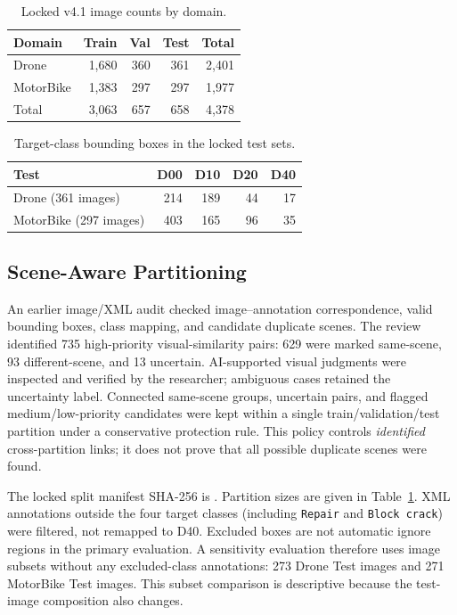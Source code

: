 \documentclass[conference,a4paper]{IEEEtran}
\begin{document}
\begin{table}[t]
\centering\caption{Locked v4.1 image counts by domain.}\label{tab:counts}
\begin{tabular}{lrrrr}\toprule
Domain & Train & Val & Test & Total\\\midrule
Drone & 1,680 & 360 & 361 & 2,401\\
MotorBike & 1,383 & 297 & 297 & 1,977\\\midrule
Total & 3,063 & 657 & 658 & 4,378\\\bottomrule
\end{tabular}
\end{table}

\begin{table}[t]
\centering\caption{Target-class bounding boxes in the locked test sets.}\label{tab:boxes}
\begin{tabular}{lrrrr}\toprule
Test & D00 & D10 & D20 & D40\\\midrule
Drone (361 images) & 214 & 189 & 44 & 17\\
MotorBike (297 images) & 403 & 165 & 96 & 35\\\bottomrule
\end{tabular}
\end{table}

\subsection{Scene-Aware Partitioning}
An earlier image/XML audit checked image–annotation correspondence, valid bounding boxes, class mapping, and candidate duplicate scenes. The review identified 735 high-priority visual-similarity pairs: 629 were marked same-scene, 93 different-scene, and 13 uncertain. AI-supported visual judgments were inspected and verified by the researcher; ambiguous cases retained the uncertainty label. Connected same-scene groups, uncertain pairs, and flagged medium/low-priority candidates were kept within a single train/validation/test partition under a conservative protection rule. This policy controls \emph{identified} cross-partition links; it does not prove that all possible duplicate scenes were found.

The locked split manifest SHA-256 is \texttt{}. Partition sizes are given in Table~\ref{tab:counts}. XML annotations outside the four target classes (including \texttt{Repair} and \texttt{Block crack}) were filtered, not remapped to D40. Excluded boxes are not automatic ignore regions in the primary evaluation. A sensitivity evaluation therefore uses image subsets without any excluded-class annotations: 273 Drone Test images and 271 MotorBike Test images. This subset comparison is descriptive because the test-image composition also changes.
\end{document}
